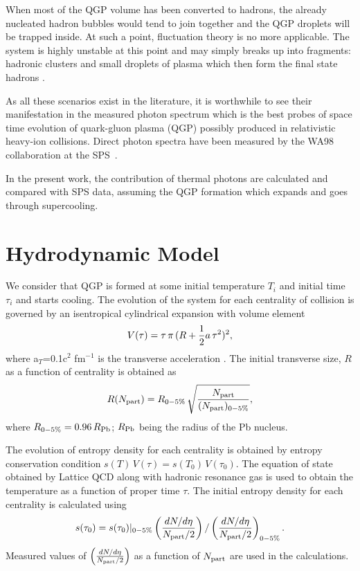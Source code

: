 \documentclass[aps,prc,preprint,superscriptaddress,showpacs,showkeys]{revtex4-1}
\begin{document}
  When most of the QGP volume has been converted to hadrons, 
the already nucleated hadron bubbles would tend to join together and 
the QGP droplets will be trapped inside. At such a point, fluctuation 
theory is no more applicable. The system is highly unstable at this point 
and may simply breaks up into fragments: hadronic clusters and small 
droplets of plasma which then form the final state hadrons \cite{ZABPRC}. 

  As all these scenarios exist in the literature, it is worthwhile 
to see their manifestation in the measured photon spectrum 
which is the best probes of space time evolution of 
quark-gluon plasma (QGP) possibly produced in relativistic heavy-ion
collisions. Direct photon spectra have been measured by
the WA98 collaboration at the SPS~\cite{WA98}.

   In the present work, the contribution of thermal photons  
are calculated and compared with SPS data, assuming the QGP formation which 
expands and goes through supercooling.


\section{Hydrodynamic Model}

We consider that QGP is formed at some initial temperature $T_i$ and
initial time $\tau_i$ and starts cooling. The evolution of the system for each 
centrality of collision is governed by an isentropical cylindrical expansion with volume element
\begin{equation}
V(\tau) = \tau\,\pi\,(R + {1\over 2} a \, \tau^2 )^{2},
\end{equation}
 where a$_T$=0.1c$^2$ fm$^{-1}$ is the transverse acceleration \cite{Zhao:2011cv}.
 The initial transverse size, $R$ as a function of centrality is obtained as 
\begin{equation}
R(N_{\rm part}) = R_{0-5\%} \, \sqrt{N_{\rm part} \over (N_{\rm part})_{0-5\%} },
\label{RVsNPart}
\end{equation}
where $R_{0-5\%} = 0.96\,R_{\rm Pb}$; $R_{\rm Pb}$ being the radius of the Pb nucleus.

The evolution of entropy density for each centrality is obtained by entropy conservation 
condition $s(T)\,V(\tau)= s(T_0)\,V(\tau_0)$.
The equation of state obtained by Lattice QCD along with hadronic resonance gas \cite{Huovinen:2009yb} 
is used to obtain the temperature as a function of proper time $\tau$.
  The initial entropy density for each centrality is calculated using 
\begin{equation}
s(\tau_0) = s(\tau_0)|_{0-5\%} \left(\frac{dN/d\eta}{N_{\rm part}/2}\right)/\left(\frac{dN/d\eta}{N_{\rm part}/2}\right)_{0-5\%}.
\label{TempNpart}
\end{equation}
Measured values of $\left(\frac{dN/d\eta}{N_{\rm part}/2}\right)$ as a function of $N_{\rm part}$ 
\cite{Aamodt:2010cz,Chatrchyan:2011pb} are used in the calculations.
\end{document}
